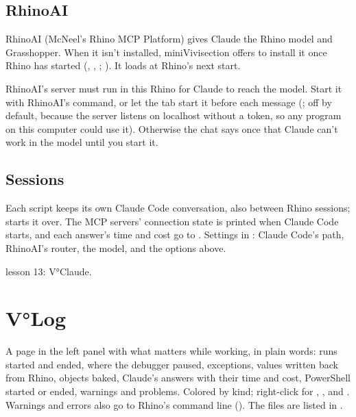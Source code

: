\subsection{RhinoAI}\label{sec:rhinoai}

RhinoAI (McNeel's Rhino MCP Platform) gives Claude the Rhino model and Grasshopper. When it isn't installed,
miniVivisection offers to install it once Rhino has started (, , ;
). It loads at Rhino's next start.

RhinoAI's server must run in this Rhino for Claude to reach the model. Start it with RhinoAI's 
command, or let the tab start it before each message (; off by
default, because the server listens on localhost without a token, so any program on this computer could use
it). Otherwise the chat says once that Claude can't work in the model until you start it.

\subsection{Sessions}

Each script keeps its own Claude Code conversation, also between Rhino sessions;  starts it over.
The MCP servers' connection state is printed when Claude Code starts, and each answer's time and cost go to
. Settings in : Claude Code's path, RhinoAI's router, the model, and the
options above.

\begin{lesson}{lesson 13}: V°Claude.\end{lesson}

\section{V°Log}\label{sec:vlog}

A page in the left panel with what matters while working, in plain words: runs started and ended, where the
debugger paused, exceptions, values written back from Rhino, objects baked, Claude's answers with their time
and cost, PowerShell started or ended, warnings and problems. Colored by kind; right-click for ,
,  and . Warnings and errors also go to Rhino's command line
(). The files are listed in .


